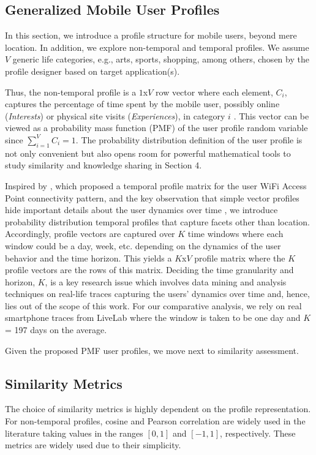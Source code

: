 \documentclass[conference]{IEEEtran}
\theoremstyle{definition}
\begin{document}
\subsection{Generalized Mobile User Profiles}
\vspace{-0.2 cm}
In this section, we introduce a profile structure
for mobile users, beyond mere location. In addition, we explore 
non-temporal and temporal profiles. We assume $V$ generic life
categories, e.g., arts, sports, shopping, among others, chosen by 
the profile designer based on target application(s).

Thus, the non-temporal profile is a $1$x$V$ row vector where each element, $C_i$, 
captures the percentage of time spent by the mobile user, possibly online 
({\it Interests}) or physical site visits ({\it Experiences}), in category $i$ 
\cite{Mai13}. This vector can be viewed as a probability mass function 
(PMF) of the user profile random variable since $\sum_{i=1}^V C_i=1$. The 
probability distribution definition of the user profile is not only convenient 
but also opens room for powerful mathematical tools to study similarity 
and knowledge sharing in Section 4.

Inspired by \cite{csi}, which proposed a temporal profile matrix for the 
user WiFi Access Point connectivity pattern, and the key observation 
that simple vector profiles hide important details about the user 
dynamics over time \cite{Mai13}, we introduce probability distribution temporal 
profiles that capture facets other than location. Accordingly, 
profile vectors are captured over $K$ time windows where each window could 
be a day, week, etc. depending on the dynamics of the user behavior and the 
time horizon. This yields a $K$x$V$ profile matrix where the $K$ profile 
vectors are the rows of this matrix. Deciding the time granularity and horizon, 
$K$, is a key research issue which involves data mining and analysis techniques 
on real-life traces capturing the users' dynamics over time and, hence, lies out of 
the scope of this work. For our comparative analysis, we rely on real
smartphone traces from LiveLab \cite{data} where the window is taken to be one 
day and $K$ = 197 days on the average.

Given the proposed PMF user profiles, we move next to
similarity assessment.
%
\vspace{-0.4 cm}
\subsection{Similarity Metrics}
\vspace{-0.2 cm}
The choice of similarity metrics is highly dependent on the
profile representation. For non-temporal profiles, cosine and Pearson
correlation are widely used in the literature \cite{sim}
taking values in the ranges $[0,1]$ and $[-1,1]$, respectively.
These metrics are widely used due to their simplicity. 
\end{document}
